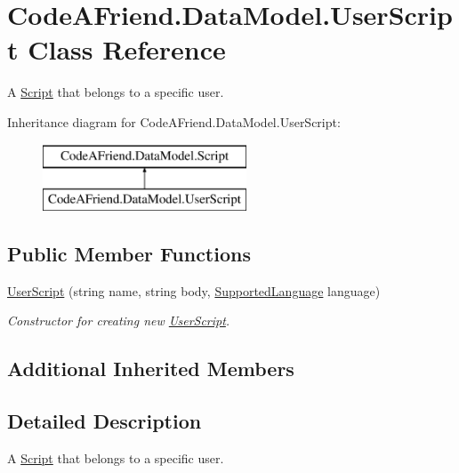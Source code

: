 \hypertarget{class_code_a_friend_1_1_data_model_1_1_user_script}{}\section{Code\+A\+Friend.\+Data\+Model.\+User\+Script Class Reference}
\label{class_code_a_friend_1_1_data_model_1_1_user_script}


A \mbox{\hyperlink{class_code_a_friend_1_1_data_model_1_1_script}{Script}} that belongs to a specific user.  


Inheritance diagram for Code\+A\+Friend.\+Data\+Model.\+User\+Script\+:\begin{figure}[H]
\begin{center}
\leavevmode
\includegraphics[height=2.000000cm]{class_code_a_friend_1_1_data_model_1_1_user_script}
\end{center}
\end{figure}
\subsection*{Public Member Functions}
\begin{DoxyCompactItemize}
\item 
\mbox{\hyperlink{class_code_a_friend_1_1_data_model_1_1_user_script_a2d9bbf3cdb8d330b15c7bb18f9b5c145}{User\+Script}} (string name, string body, \mbox{\hyperlink{namespace_code_a_friend_1_1_data_model_a13e088c525db1b03a4de75420ced79b2}{Supported\+Language}} language)
\begin{DoxyCompactList}\small\item\em Constructor for creating new \mbox{\hyperlink{class_code_a_friend_1_1_data_model_1_1_user_script}{User\+Script}}.\end{DoxyCompactList}\end{DoxyCompactItemize}
\subsection*{Additional Inherited Members}


\subsection{Detailed Description}
A \mbox{\hyperlink{class_code_a_friend_1_1_data_model_1_1_script}{Script}} that belongs to a specific user. 



